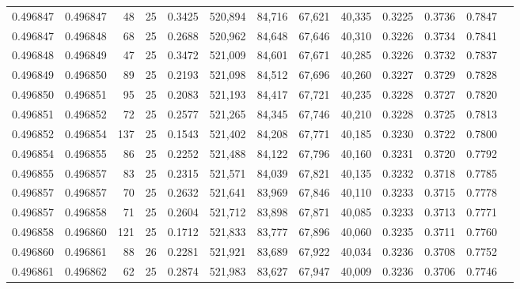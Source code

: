 \begin{tabular}{rrrrrrrrrrrrr}
0.496847 & 0.496847 &    48 &  25 &                                     0.3425 & 520,894 &  84,716 &  67,621 &  40,335 & 0.3225 & 0.3736 & 0.7847 \\
0.496847 & 0.496848 &    68 &  25 &                                     0.2688 & 520,962 &  84,648 &  67,646 &  40,310 & 0.3226 & 0.3734 & 0.7841 \\
0.496848 & 0.496849 &    47 &  25 &                                     0.3472 & 521,009 &  84,601 &  67,671 &  40,285 & 0.3226 & 0.3732 & 0.7837 \\
0.496849 & 0.496850 &    89 &  25 &                                     0.2193 & 521,098 &  84,512 &  67,696 &  40,260 & 0.3227 & 0.3729 & 0.7828 \\
0.496850 & 0.496851 &    95 &  25 &                                     0.2083 & 521,193 &  84,417 &  67,721 &  40,235 & 0.3228 & 0.3727 & 0.7820 \\
0.496851 & 0.496852 &    72 &  25 &                                     0.2577 & 521,265 &  84,345 &  67,746 &  40,210 & 0.3228 & 0.3725 & 0.7813 \\
0.496852 & 0.496854 &   137 &  25 &                                     0.1543 & 521,402 &  84,208 &  67,771 &  40,185 & 0.3230 & 0.3722 & 0.7800 \\
0.496854 & 0.496855 &    86 &  25 &                                     0.2252 & 521,488 &  84,122 &  67,796 &  40,160 & 0.3231 & 0.3720 & 0.7792 \\
0.496855 & 0.496857 &    83 &  25 &                                     0.2315 & 521,571 &  84,039 &  67,821 &  40,135 & 0.3232 & 0.3718 & 0.7785 \\
0.496857 & 0.496857 &    70 &  25 &                                     0.2632 & 521,641 &  83,969 &  67,846 &  40,110 & 0.3233 & 0.3715 & 0.7778 \\
0.496857 & 0.496858 &    71 &  25 &                                     0.2604 & 521,712 &  83,898 &  67,871 &  40,085 & 0.3233 & 0.3713 & 0.7771 \\
0.496858 & 0.496860 &   121 &  25 &                                     0.1712 & 521,833 &  83,777 &  67,896 &  40,060 & 0.3235 & 0.3711 & 0.7760 \\
0.496860 & 0.496861 &    88 &  26 &                                     0.2281 & 521,921 &  83,689 &  67,922 &  40,034 & 0.3236 & 0.3708 & 0.7752 \\
0.496861 & 0.496862 &    62 &  25 &                                     0.2874 & 521,983 &  83,627 &  67,947 &  40,009 & 0.3236 & 0.3706 & 0.7746 \\

\end{tabular}
